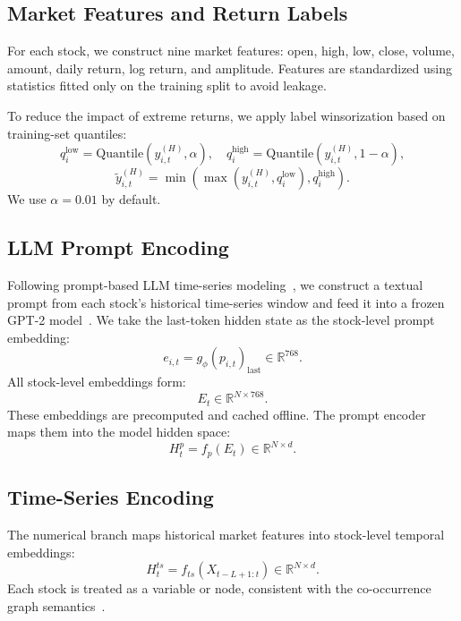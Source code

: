 \documentclass[runningheads]{llncs}
\begin{document}
\subsection{Market Features and Return Labels}

For each stock, we construct nine market features: open, high, low, close, volume, amount, daily return, log return, and amplitude. Features are standardized using statistics fitted only on the training split to avoid leakage.

To reduce the impact of extreme returns, we apply label winsorization based on training-set quantiles:
\begin{equation}
q_i^{\text{low}} = \text{Quantile}(y^{(H)}_{i,t}, \alpha), \quad
q_i^{\text{high}} = \text{Quantile}(y^{(H)}_{i,t}, 1-\alpha),
\end{equation}
\begin{equation}
\tilde{y}^{(H)}_{i,t} = \min \left( \max \left(y^{(H)}_{i,t}, q_i^{\text{low}}\right), q_i^{\text{high}} \right).
\end{equation}
We use $\alpha = 0.01$ by default.

\subsection{LLM Prompt Encoding}

Following prompt-based LLM time-series modeling~\cite{jin2023timellm,liu2025timecma}, we construct a textual prompt from each stock's historical time-series window and feed it into a frozen GPT-2 model~\cite{radford2019language}. We take the last-token hidden state as the stock-level prompt embedding:
\begin{equation}
e_{i,t} = g_\phi(p_{i,t})_{\text{last}} \in \mathbb{R}^{768}.
\end{equation}
All stock-level embeddings form:
\begin{equation}
E_t \in \mathbb{R}^{N \times 768}.
\end{equation}
These embeddings are precomputed and cached offline. The prompt encoder maps them into the model hidden space:
\begin{equation}
H_t^{p} = f_p(E_t) \in \mathbb{R}^{N \times d}.
\end{equation}

\subsection{Time-Series Encoding}

The numerical branch maps historical market features into stock-level temporal embeddings:
\begin{equation}
H_t^{ts} = f_{ts}(X_{t-L+1:t}) \in \mathbb{R}^{N \times d}.
\end{equation}
Each stock is treated as a variable or node, consistent with the co-occurrence graph semantics~\cite{liu2023itransformer,liu2025timecma}.
\end{document}
